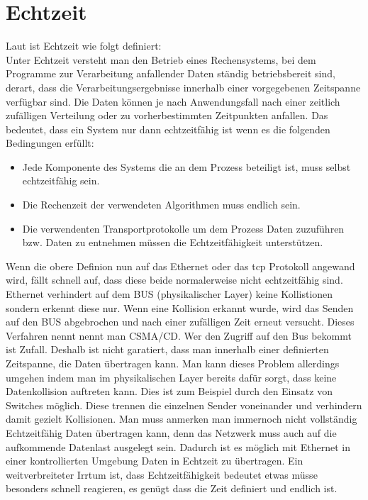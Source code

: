 \section{Echtzeit}
Laut \citet{Scholz:2005} ist Echtzeit wie folgt definiert:\\
\flqq Unter Echtzeit versteht man den Betrieb
eines Rechensystems, bei dem Programme zur Verarbeitung
anfallender Daten ständig betriebsbereit sind, derart, dass die
Verarbeitungsergebnisse innerhalb einer vorgegebenen Zeitspanne
verfügbar sind. Die Daten können je nach Anwendungsfall nach
einer zeitlich zufälligen Verteilung oder zu vorherbestimmten
Zeitpunkten anfallen.\frqq
Das bedeutet, dass ein System nur dann echtzeitfähig ist wenn es die folgenden Bedingungen erfüllt:
\begin{itemize}
  \item Jede Komponente des Systems die an dem Prozess beteiligt ist, muss selbst echtzeitfähig sein.
  \item Die Rechenzeit der verwendeten Algorithmen muss endlich sein.
  \item Die verwendenten Transportprotokolle um dem Prozess Daten zuzuführen bzw. Daten zu entnehmen müssen die Echtzeitfähigkeit unterstützen.
\end{itemize}
Wenn die obere Definion nun auf das Ethernet oder das \ac{tcp} Protokoll angewand wird, fällt schnell auf, 
dass diese beide normalerweise nicht echtzeitfähig sind.
Ethernet verhindert auf dem BUS (physikalischer Layer) keine Kollistionen sondern erkennt diese nur. 
Wenn eine Kollision erkannt wurde, 
wird das Senden auf den BUS abgebrochen und nach einer zufälligen Zeit erneut versucht.
Dieses Verfahren nennt nennt man \ac{CSMA/CD}. 
Wer den Zugriff auf den Bus bekommt ist Zufall.
Deshalb ist nicht garatiert, dass man innerhalb einer definierten Zeitspanne, die Daten übertragen kann.
Man kann dieses Problem allerdings umgehen indem man im physikalischen Layer bereits dafür sorgt, 
dass keine Datenkollision auftreten kann. Dies ist zum Beispiel durch den Einsatz von Switches möglich.
Diese trennen die einzelnen Sender voneinander und verhindern damit gezielt Kollisionen.
Man muss anmerken man immernoch nicht vollständig Echtzeitfähig Daten übertragen kann, 
denn das Netzwerk muss auch auf die aufkommende Datenlast ausgelegt sein.
Dadurch ist es möglich mit Ethernet in einer kontrollierten Umgebung Daten in Echtzeit zu übertragen.
Ein weitverbreiteter Irrtum ist, dass Echtzeitfähigkeit bedeutet etwas müsse besonders schnell reagieren, 
es genügt dass die Zeit definiert und endlich ist.